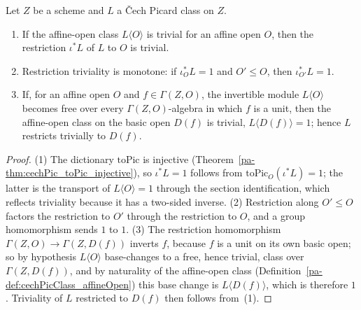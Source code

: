 \begin{theorem}
  \label{pa-thm:cechPicClass_triv}
  \leanok

  Let \(Z\) be a scheme and \(L\) a \v Cech Picard class on \(Z\).
  \begin{enumerate}
    \item If the affine-open class \(L\langle O\rangle\) is trivial for an affine open \(O\), then
      the restriction \(\iota^{*}L\) of \(L\) to \(O\) is trivial.
    \item Restriction triviality is monotone: if \(\iota_O^{*}L = 1\) and \(O' \le O\), then
      \(\iota_{O'}^{*}L = 1\).
    \item If, for an affine open \(O\) and \(f \in \Gamma(Z, O)\), the invertible module \(L\langle
      O\rangle\) becomes free over every \(\Gamma(Z, O)\)-algebra in which \(f\) is a unit, then the
      affine-open class on the basic open \(D(f)\) is trivial, \(L\langle D(f)\rangle = 1\); hence
      \(L\) restricts trivially to \(D(f)\).
  \end{enumerate}
\end{theorem}
\begin{proof}
  \leanok
  (1) The dictionary \(\mathrm{toPic}\) is injective (Theorem~\ref{pa-thm:cechPic_toPic_injective}), so
  \(\iota^{*}L = 1\) follows from \(\mathrm{toPic}_O(\iota^{*}L) = 1\); the latter is the transport
  of \(L\langle O\rangle = 1\) through the section identification, which reflects triviality because
  it has a two-sided inverse. (2) Restriction along \(O' \le O\) factors the restriction to \(O'\)
  through the restriction to \(O\), and a group homomorphism sends \(1\) to \(1\). (3) The
  restriction homomorphism \(\Gamma(Z, O) \to \Gamma(Z, D(f))\) inverts \(f\), because \(f\) is a
  unit on its own basic open; so by hypothesis \(L\langle O\rangle\) base-changes to a free, hence
  trivial, class over \(\Gamma(Z, D(f))\), and by naturality of the affine-open class
  (Definition~\ref{pa-def:cechPicClass_affineOpen}) this base change is \(L\langle D(f)\rangle\), which
  is therefore \(1\). Triviality of \(L\) restricted to \(D(f)\) then follows from~(1).
\end{proof}

